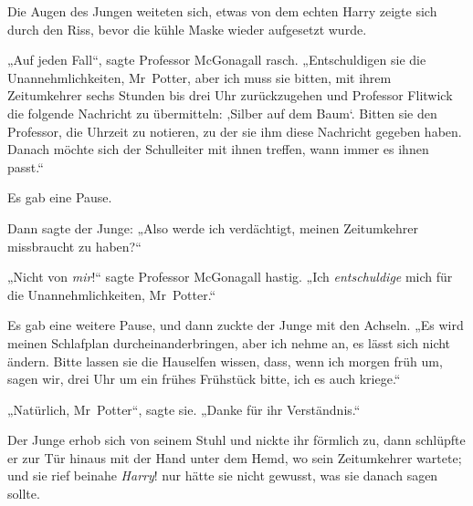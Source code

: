 Die Augen des Jungen weiteten sich, etwas von dem echten Harry zeigte sich durch den Riss, bevor die kühle Maske wieder aufgesetzt wurde.

„Auf jeden Fall“, sagte Professor McGonagall rasch.
„Entschuldigen sie die Unannehmlichkeiten, Mr~Potter, aber ich muss sie bitten, mit ihrem Zeitumkehrer sechs Stunden bis drei Uhr zurückzugehen und Professor Flitwick die folgende Nachricht zu übermitteln: ‚Silber auf dem Baum‘. Bitten sie den Professor, die Uhrzeit zu notieren, zu der sie ihm diese Nachricht gegeben haben. Danach möchte sich der Schulleiter mit ihnen treffen, wann immer es ihnen passt.“

Es gab eine Pause.

Dann sagte der Junge:
„Also werde ich verdächtigt, meinen Zeitumkehrer missbraucht zu haben?“

„Nicht von \emph{mir}!“ sagte Professor McGonagall hastig.
„Ich \emph{entschuldige} mich für die Unannehmlichkeiten, Mr~Potter.“

Es gab eine weitere Pause, und dann zuckte der Junge mit den Achseln.
„Es wird meinen Schlafplan durcheinanderbringen, aber ich nehme an, es lässt sich nicht ändern. Bitte lassen sie die Hauselfen wissen, dass, wenn ich morgen früh um, sagen wir, drei Uhr um ein frühes Frühstück bitte, ich es auch kriege.“

„Natürlich, Mr~Potter“, sagte sie.
„Danke für ihr Verständnis.“

Der Junge erhob sich von seinem Stuhl und nickte ihr förmlich zu, dann schlüpfte er zur Tür hinaus mit der Hand unter dem Hemd, wo sein Zeitumkehrer wartete; und sie rief beinahe \emph{Harry}! nur hätte sie nicht gewusst, was sie danach sagen sollte.

